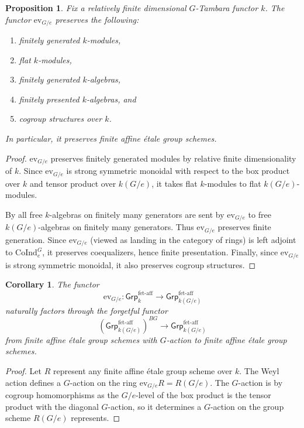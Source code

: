 \documentclass[11pt,dvipsnames]{amsart}
\newtheorem{proposition}[theorem]{Proposition}
\newtheorem{corollary}[theorem]{Corollary}
\theoremstyle{BoldRemark}
\newcommand{\Coind}{\mathrm{CoInd}}
\newcommand{\ev}{\mathrm{ev}}
\newcommand{\fet}{\mathsf{Grp}^{\mathrm{f\acute{e}t\text{-}aff}}}
\begin{document}
\begin{proposition}\label{thm:bottom-level-preserves-finite-affine-etale-group-schemes}
	Fix a relatively finite dimensional $G$-Tambara functor $k$. The functor $\ev_{G/e}$ preserves the following:
	\begin{enumerate}
		\item finitely generated $k$-modules,
		\item flat $k$-modules,
		\item finitely generated $k$-algebras,
		\item finitely presented $k$-algebras, and
		\item cogroup structures over $k$.
	\end{enumerate}
	In particular, it preserves finite affine \'{e}tale group schemes. 
\end{proposition}

\begin{proof}
	$\ev_{G/e}$ preserves finitely generated modules by relative finite dimensionality of $k$. Since $\ev_{G/e}$ is strong symmetric monoidal with respect to the box product over $k$ and tensor product over $k(G/e)$, it takes flat $k$-modules to flat $k(G/e)$-modules.
	
	By \cite[Theorem A]{Bru05} all free $k$-algebras on finitely many generators are sent by $\ev_{G/e}$ to free $k(G/e)$-algebras on finitely many generators. Thus $\ev_{G/e}$ preserves finite generation. Since $\ev_{G/e}$ (viewed as landing in the category of rings) is left adjoint to $\Coind_e^G$, it preserves coequalizers, hence finite presentation. Finally, since $\ev_{G/e}$ is strong symmetric monoidal, it also preserves cogroup structures.
\end{proof}

\begin{corollary}\label{cor:ev-lands-in-etale-group-schemes-with-G-action}
    The functor 
    \[ 
        \ev_{G/e} : \fet_k \rightarrow \fet_{k(G/e)} 
    \]
    naturally factors through the forgetful functor 
    \[ 
        (\fet_{k(G/e)})^{BG} \rightarrow \fet_{k(G/e)} 
    \]
    from finite affine \'{e}tale group schemes with $G$-action to finite affine \'{e}tale group schemes.
\end{corollary}

\begin{proof}
    Let $R$ represent any finite affine \'{e}tale group scheme over $k$. The Weyl action defines a $G$-action on the ring $\ev_{G/e} R = R(G/e)$. The $G$-action is by cogroup homomorphisms as the $G/e$-level of the box product is the tensor product with the diagonal $G$-action, so it determines a $G$-action on the group scheme $R(G/e)$ represents.
\end{proof}
\end{document}
